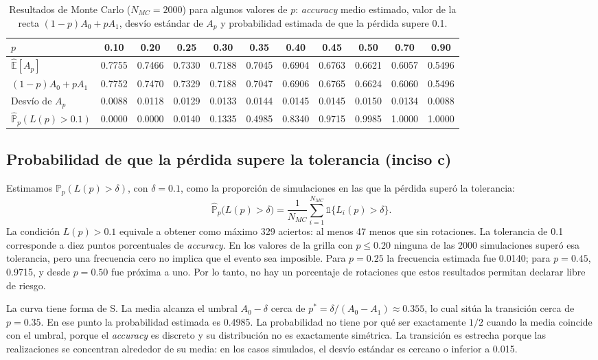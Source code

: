 \documentclass[11pt,a4paper]{article}
\newcommand{\E}{\mathbb{E}}
\newcommand{\Prob}{\mathbb{P}}
\newcommand{\ind}{\mathds{1}}
\newcommand{\acc}{\emph{accuracy}}
\begin{document}
\begin{table}[H]
  \centering
  \caption{Resultados de Monte Carlo ($N_{MC}=2000$) para algunos valores de $p$: \emph{accuracy} medio
           estimado, valor de la recta $(1-p)A_0+pA_1$, desvío estándar de $A_p$ y probabilidad estimada de
           que la pérdida supere 0.1.}
  \label{tab:mc}
  \small
  \setlength{\tabcolsep}{4.5pt}
  \begin{tabular}{lcccccccccc}
    \toprule
    $p$ & 0.10 & 0.20 & 0.25 & 0.30 & 0.35 & 0.40 & 0.45 & 0.50 & 0.70 & 0.90 \\
    \midrule
    $\widehat{\E}[A_p]$           & 0.7755 & 0.7466 & 0.7330 & 0.7188 & 0.7045 & 0.6904 & 0.6763 & 0.6621 & 0.6057 & 0.5496 \\
    $(1-p)A_0+pA_1$               & 0.7752 & 0.7470 & 0.7329 & 0.7188 & 0.7047 & 0.6906 & 0.6765 & 0.6624 & 0.6060 & 0.5496 \\
    Desvío de $A_p$               & 0.0088 & 0.0118 & 0.0129 & 0.0133 & 0.0144 & 0.0145 & 0.0145 & 0.0150 & 0.0134 & 0.0088 \\
    $\widehat{\Prob}_p(L(p)>0.1)$ & 0.0000 & 0.0000 & 0.0140 & 0.1335 & 0.4985 & 0.8340 & 0.9715 & 0.9985 & 1.0000 & 1.0000 \\
    \bottomrule
  \end{tabular}
\end{table}

\subsection{Probabilidad de que la pérdida supere la tolerancia (inciso c)}

Estimamos $\Prob_p(L(p)>\delta)$, con $\delta=0.1$, como la proporción de simulaciones en las que la pérdida
superó la tolerancia:
\[ \widehat{\Prob}_p\big(L(p)>\delta\big) = \frac{1}{N_{MC}}\sum_{i=1}^{N_{MC}}\ind\{L_i(p)>\delta\} . \]
La condición $L(p)>0.1$ equivale a obtener como máximo 329 aciertos: al menos 47 menos que sin
rotaciones. La tolerancia de 0.1 corresponde a diez puntos porcentuales de \acc{}. En los valores de la
grilla con $p\le0.20$ ninguna de las 2000 simulaciones superó esa tolerancia, pero una frecuencia cero no
implica que el evento sea imposible. Para $p=0.25$ la frecuencia estimada fue 0.0140; para $p=0.45$, 0.9715,
y desde $p=0.50$ fue próxima a uno. Por lo tanto, no hay un porcentaje de rotaciones que estos resultados
permitan declarar libre de riesgo.

La curva tiene forma de S. La media alcanza el umbral $A_0-\delta$ cerca de
$p^*=\delta/(A_0-A_1)\approx0.355$, lo cual sitúa la transición cerca de $p=0.35$. En ese punto la
probabilidad estimada es 0.4985. La probabilidad no tiene por qué ser exactamente $1/2$ cuando la media
coincide con el umbral, porque el \acc{} es discreto y su distribución no es exactamente simétrica.
La transición es estrecha porque las realizaciones se concentran alrededor de su media: en los casos
simulados, el desvío estándar es cercano o inferior a 0.015.
\end{document}
